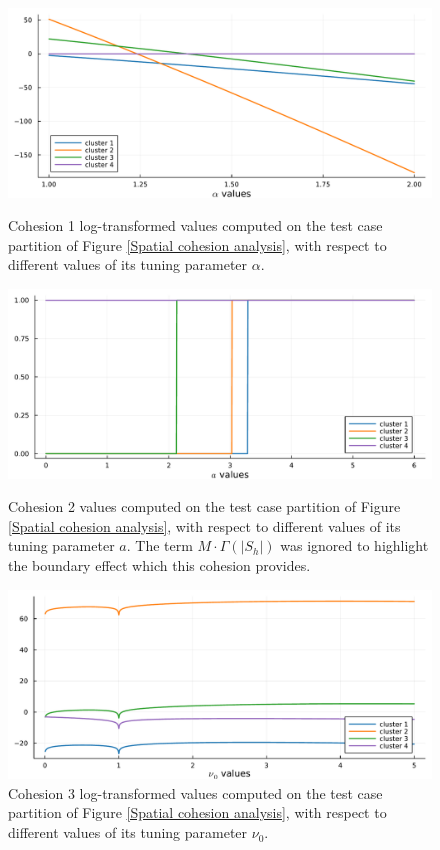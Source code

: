 \documentclass[12pt,	%
	a4paper,		%
	twoside,		%
	openright,		%
	titlepage,%
	]{book}
\theoremstyle{definition}
\begin{document}
\begin{figure}[!p]
\centering
\includegraphics[width=1\linewidth]{model description/new space plots/cohesion1.pdf}
\caption[Spatial cohesion 1 analysis]{Cohesion 1 log-transformed values computed on the test case partition of Figure \ref{Spatial cohesion analysis}, with respect to different values of its tuning parameter $\alpha$.}
\label{sub:cohes1}
\includegraphics[width=1\linewidth]{model description/new space plots/cohesion2.pdf}
\caption[Spatial cohesion 2 analysis]{Cohesion 2 values computed on the test case partition of Figure \ref{Spatial cohesion analysis}, with respect to different values of its tuning parameter $a$. The term $M\cdot \Gamma(|S_h|)$ was ignored to highlight the boundary effect which this cohesion provides.}
\label{sub:cohes2}
\includegraphics[width=1\linewidth]{model description/new space plots/cohesion3.pdf}
\caption[Spatial cohesion 3 analysis]{Cohesion 3 log-transformed values computed on the test case partition of Figure \ref{Spatial cohesion analysis}, with respect to different values of its tuning parameter $\nu_0$.}
\label{sub:cohes3}
\end{figure}
\end{document}
